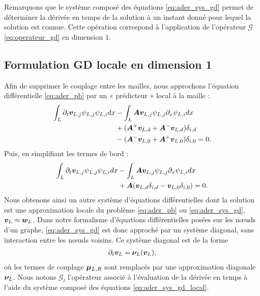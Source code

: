 Remarquons que le système composé des équations \eqref{eq:ader_sys_gd}
permet de déterminer la dérivée en temps
de la solution à un instant donné pour lequel la solution est connue.
Cette opération correspond à l'application de l'opérateur $\mathcal{G}$
\eqref{eq:operateur_gd} en dimension $1$.
\\


\subsection{Formulation GD locale en dimension 1}
\label{ssect:formulation_gd_locale}


Afin de supprimer le couplage entre les mailles,
nous approchons l'équation différentielle
\eqref{eq:ader_pb} par un « prédicteur » local
à la maille :
\begin{equation}
	\begin{aligned}
		\int_{L} \partial_{t} \bm{v}_{L,j} \psi_{L,j} \psi_{L,i} dx
		&- \int_{L} \bm{A} \bm{v}_{L,j} \psi_{L,j} \partial_{x} \psi_{L,i} dx \\
		&+ (\bm{A}^{+} \bm{v}_{L,d} +
		\bm{A}^{-} \bm{v}_{L,d}) \delta_{i,d} \\
		&- (\bm{A}^{-} \bm{v}_{L,0} +
		\bm{A}^{+} \bm{v}_{L,0}) \delta_{i,0} = 0 .
	\end{aligned}
\end{equation}
Puis, en simplifiant les termes de bord :
\begin{equation}
\begin{aligned}
\int_{L} \partial_{t} \bm{v}_{L,j} \psi_{L,j} \psi_{L,i} dx
&- \int_{L} \bm{A} \bm{v}_{L,j} \psi_{L,j} \partial_{x} \psi_{L,i} dx \\
&+ \bm{A} (\bm{v}_{L,d} \delta_{i,d}
- \bm{v}_{L,0} \delta_{i,0}) = 0 .
\end{aligned}
\end{equation}
Nous obtenons ainsi un autre système d'équations différentielles dont
la solution est une approximation locale du problème \eqref{eq:ader_pb} ou \eqref{eq:ader_sys_gd},
$\bm{v}_L \approx \bm{w}_L$. Dans notre formalisme d'équations différentielles
posées sur les nœuds d'un graphe, \eqref{eq:ader_sys_gd} est donc approché par un système diagonal, sans interaction 
entre les nœuds voisins. Ce système diagonal est de la forme
\begin{align} \label{eq:ader_sys_gd_local}
	\partial_{t} \bm{v}_L = \bm{\nu}_{L} (\bm{v}_L) ,
\end{align}
où les termes de couplage $\bm{\mu}_{L,R}$ sont remplacés par une approximation diagonale $\bm{\nu}_{L}$.
Nous notons $\mathcal{G}_l$ l'opérateur associé à l'évaluation
de la dérivée en temps à l'aide du système composé
des équations \eqref{eq:ader_sys_gd_local}.

